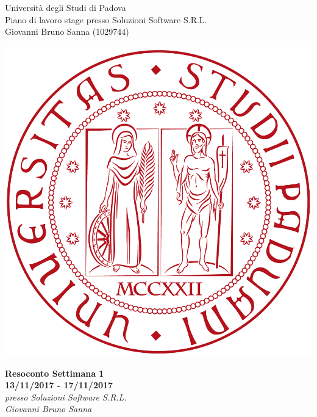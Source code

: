 \documentclass[11pt,notitlepage]{article}
\makeatletter
\newcommand{\nomeStudente}{Giovanni Bruno}
\newcommand{\cognomeStudente}{Sanna}
\newcommand{\matricolaStudente}{1029744}
\newcommand{\emailStudente}{giovannibruno.sanna@studenti.unipd.com}
\newcommand{\telStudente}{+39 0000000000}
\newcommand{\nomeTutorAziendale}{Nome}
\newcommand{\cognomeTutorAziendale}{Cognome}
\newcommand{\emailTutorAziendale}{xxtutor@azienda.it}
\newcommand{\telTutorAziendale}{+39 0000000000}
\newcommand{\ragioneSocAzienda}{Soluzioni Software S.R.L.}
\newcommand{\indirizzoAzienda}{Via Via dei Ronchi, 21, 35127 Padova (PD)}
\newcommand{\sitoAzienda}{http://www.soluzioni-sw.it/}
\makeatother
\begin{document}
	
\noindent
\parbox{0.7\columnwidth}{Università degli Studi di Padova\\
	Piano di lavoro stage presso \ragioneSocAzienda{}\\
	\nomeStudente{} \cognomeStudente{} (\matricolaStudente{})}%
\parbox{0.3\columnwidth}{
	\hfill \includegraphics[scale=0.08]{immagini/logo-unipd.png}}

\bigskip
\begin{center}
{\Huge \textbf{Resoconto Settimana 1}} \\ 
{\textbf{13/11/2017 - 17/11/2017}} \\ \bigskip
	{\Large \textit{presso \ragioneSocAzienda{}}}\\ \bigskip
	{\Large \textit{\nomeStudente{} \cognomeStudente{}}}
\end{center}

\end{document}
